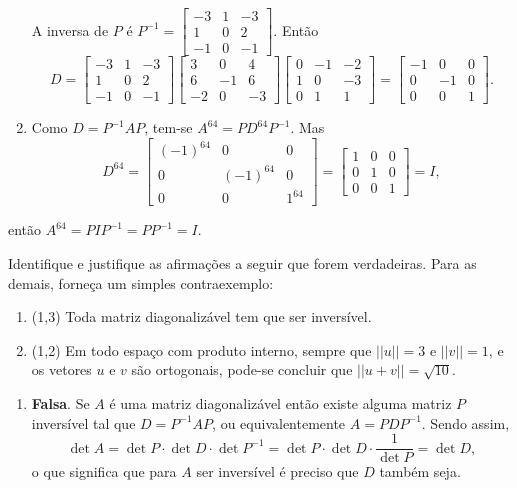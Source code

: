 \documentclass[12pt,a4paper]{article}
\newcommand{\norm}[1]{\left|\left|{#1}\right|\right|}
\begin{document}
\begin{ExerciseList}
\begin{enumerate}
A inversa de $P$ é $P ^{-1} =
\begin{bmatrix}
-3 & 1 & -3 \\
 1 & 0 &  2 \\
-1 & 0 & -1
\end{bmatrix}$. Então
\[
D =
\begin{bmatrix}
-3 & 1 & -3 \\
 1 & 0 &  2 \\
-1 & 0 & -1
\end{bmatrix}
\begin{bmatrix}
 3 &  0 &  4\\
 6 & -1 &  6\\
-2 &  0 & -3
\end{bmatrix}
\begin{bmatrix}
0 & -1 & -2 \\
1 &  0 & -3 \\
0 &  1 &  1
\end{bmatrix}
=
\begin{bmatrix}
-1 &  0 & 0 \\
 0 & -1 & 0 \\
 0 &  0 & 1
\end{bmatrix}.
\]

\item Como $D = P^{-1} A P$, tem-se $A^{64} = P D^{64} P^{-1}$. Mas
\[
D^{64}
=
\begin{bmatrix}
(-1)^{64} &  0 & 0 \\
 0 & (-1)^{64} & 0 \\
 0 &  0 & 1^{64}
\end{bmatrix}
=
\begin{bmatrix}
1 & 0 & 0 \\
0 & 1 & 0 \\
0 & 0 & 1
\end{bmatrix}
= I,
\]
\end{enumerate}
então $A^{64} = P I P^{-1} = P P^{-1} = I$.

\Exercise[title={2,5}] Identifique e justifique as afirmações a seguir que forem verdadeiras. Para as demais, forneça um simples contraexemplo:
\begin{enumerate}
\item (1,3) Toda matriz diagonalizável tem que ser inversível.
\item (1,2) Em todo espaço com produto interno, sempre que $\norm{u} = 3$ e $\norm{v} = 1$, e os vetores $u$ e $v$ são ortogonais, pode-se concluir que $\norm{u+v} = \sqrt{10}$.

\end{enumerate}
\Answer
\begin{enumerate}
\item \textbf{Falsa}. Se $A$ é uma matriz diagonalizável então existe alguma matriz $P$ inversível tal que $D = P^{-1} A P$, ou equivalentemente $A = P D P^{-1}$. Sendo assim,
\[
\det{A}
= \det{P} \cdot \det{D} \cdot \det{P^{-1}}
= \det{P} \cdot \det{D} \cdot \frac{1}{\det{P}}
= \det{D},
\]
o que significa que para $A$ ser inversível é preciso que $D$ também seja.


\end{enumerate}
\end{ExerciseList}
\end{document}
